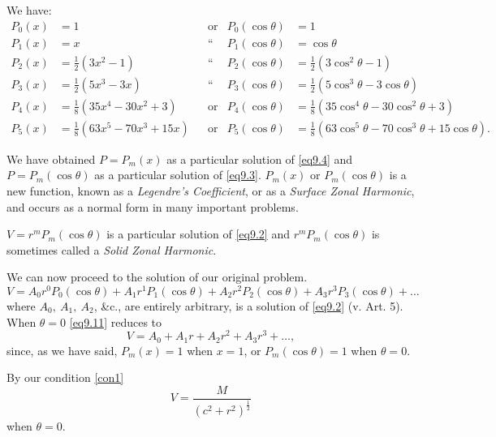 \documentclass[oneside,12pt]{book}
\begin{document}
We have:
\begin{align*}
    P_0(x)&=1 & &\text{or} & P_0(\cos\theta)&=1 \\
    P_1(x)&=x & &\text{``} & P_1(\cos\theta)&=\cos\theta \\
    P_2(x)&=\frac{1}{2}(3x^2-1) & &\text{``} & P_2(\cos\theta)&=\frac{1}{2}(3\cos^2\theta-1) \\
    P_3(x)&=\frac{1}{2}(5x^3-3x) & &\text{``} & P_3(\cos\theta)&=\frac{1}{2}(5\cos^3\theta-3\cos\theta) \\
    P_4(x)&=\frac{1}{8}(35x^4-30x^2+3) & &\text{or} & P_4(\cos\theta)&=\frac{1}{8}(35\cos^4\theta-30\cos^2\theta+3) \\
    P_5(x)&=\frac{1}{8}(63x^5-70x^3+15x) & &\text{or} & P_5(\cos\theta)&=\frac{1}{8}(63\cos^5\theta-70\cos^3\theta+15\cos\theta).
    \tag{10} \label{eq9.10}
\end{align*}   \par %

We have obtained $P=P_m(x)$ as a particular solution of \eqref{eq9.4} and $P=P_m(\cos\theta)$ as a particular solution of \eqref{eq9.3}. $P_m(x)$ or $P_m(\cos\theta)$ is a new function, known as a \textit{Legendre's Coefficient}, or as a \textit{Surface Zonal Harmonic}, and occurs as a normal form in many important problems. \par 

$V=r^mP_m(\cos\theta)$ is a particular solution of \eqref{eq9.2} and $r^mP_m(\cos\theta)$ is sometimes called a \textit{Solid Zonal Harmonic}. \par 

We can now proceed to the solution of our original problem. 
\setcounter{equation}{10}
\begin{equation}
    V=A_0r^0P_0(\cos\theta)+A_1r^1P_1(\cos\theta)+A_2r^2P_2(\cos\theta)+A_3r^3P_3(\cos\theta)+\dots 
    \label{eq9.11}
\end{equation}
where $A_0,\ A_1,\ A_2$, \&c., are entirely arbitrary, is a solution of \eqref{eq9.2} (v. Art. 5). When $\theta=0$ \eqref{eq9.11} reduces to 
$$V=A_0+A_1r+A_2r^2+A_3r^3+\dots,$$
since, as we have said, $P_m(x)=1$ when $x=1$, or $P_m(\cos\theta)=1$ when $\theta=0$. \par 

By our condition \eqref{con1}
$$V=\frac{M}{(c^2+r^2)^{\frac{1}{2}}}$$
when $\theta=0$. \par
\end{document}
